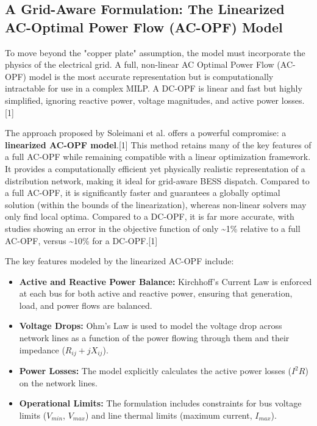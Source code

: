\subsection{A Grid-Aware Formulation: The Linearized AC-Optimal Power Flow (AC-OPF) Model}

To move beyond the "copper plate" assumption, the model must incorporate the physics of the electrical grid. A full, non-linear AC Optimal Power Flow (AC-OPF) model is the most accurate representation but is computationally intractable for use in a complex MILP. A DC-OPF is linear and fast but highly simplified, ignoring reactive power, voltage magnitudes, and active power losses.[1]

The approach proposed by Soleimani et al. offers a powerful compromise: a \textbf{linearized AC-OPF model}.[1] This method retains many of the key features of a full AC-OPF while remaining compatible with a linear optimization framework. It provides a computationally efficient yet physically realistic representation of a distribution network, making it ideal for grid-aware BESS dispatch. Compared to a full AC-OPF, it is significantly faster and guarantees a globally optimal solution (within the bounds of the linearization), whereas non-linear solvers may only find local optima. Compared to a DC-OPF, it is far more accurate, with studies showing an error in the objective function of only \textasciitilde1\% relative to a full AC-OPF, versus \textasciitilde10\% for a DC-OPF.[1]

The key features modeled by the linearized AC-OPF include:
\begin{itemize}
    \item \textbf{Active and Reactive Power Balance:} Kirchhoff's Current Law is enforced at each bus for both active and reactive power, ensuring that generation, load, and power flows are balanced.
    \item \textbf{Voltage Drops:} Ohm's Law is used to model the voltage drop across network lines as a function of the power flowing through them and their impedance ($R_{ij} + jX_{ij}$).
    \item \textbf{Power Losses:} The model explicitly calculates the active power losses ($I^2R$) on the network lines.
    \item \textbf{Operational Limits:} The formulation includes constraints for bus voltage limits ($V_{min}$, $V_{max}$) and line thermal limits (maximum current, $I_{max}$).
\end{itemize}

